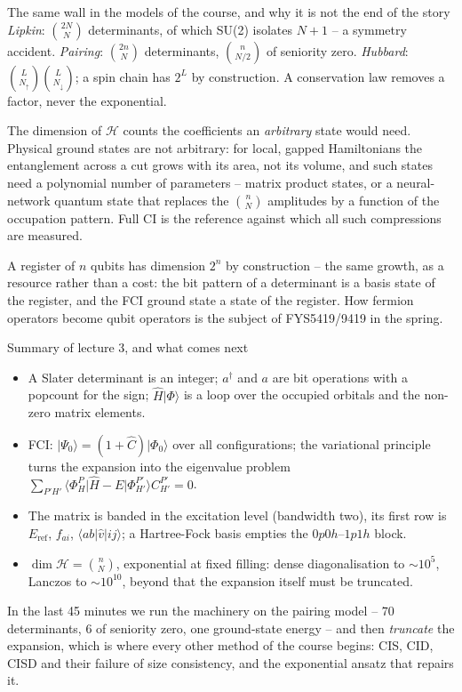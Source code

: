 \documentclass[aspectratio=169,10pt]{beamer}
\newcommand{\mbbox}[1]{%
  \begin{tcolorbox}[colback=paleblue,colframe=uioblue,title={\bfseries Many-body connection}]
  #1
  \end{tcolorbox}}
\newcommand{\qcbox}[1]{%
  \begin{tcolorbox}[colback=paleteal,colframe=teal,title={\bfseries Quantum computing connection}]
  #1
  \end{tcolorbox}}
\newcommand{\ket}[1]{\vert #1\rangle}
\newcommand{\bra}[1]{\langle #1\vert}
\newcommand{\element}[3]{\langle #1\vert #2\vert #3\rangle}
\begin{document}
\begin{frame}{The same wall in the models of the course, and why it is not the end of the story}
  \footnotesize\vspace{-0.5em}
  \emph{Lipkin}: $\binom{2N}{N}$ determinants, of which SU(2) isolates $N+1$ -- a symmetry accident. \emph{Pairing}: $\binom{2n}{N}$ determinants, $\binom{n}{N/2}$ of seniority zero. \emph{Hubbard}: $\binom{L}{N_\uparrow}\binom{L}{N_\downarrow}$; a spin chain has $2^L$ by construction. A conservation law removes a factor, never the exponential.
  \mbbox{\footnotesize The dimension of $\mathcal{H}$ counts the coefficients an \emph{arbitrary} state would need. Physical ground states are not arbitrary: for local, gapped Hamiltonians the entanglement across a cut grows with its area, not its volume, and such states need a polynomial number of parameters -- matrix product states, or a neural-network quantum state that replaces the $\binom{n}{N}$ amplitudes by a function of the occupation pattern. Full CI is the reference against which all such compressions are measured.}
  \qcbox{\footnotesize A register of $n$ qubits has dimension $2^n$ by construction -- the same growth, as a resource rather than a cost: the bit pattern of a determinant is a basis state of the register, and the FCI ground state a state of the register. How fermion operators become qubit operators is the subject of FYS5419/9419 in the spring.}
\end{frame}

\begin{frame}{Summary of lecture 3, and what comes next}
  \begin{itemize}
    \item A Slater determinant is an integer; $a^{\dagger}$ and $a$ are bit operations with a popcount for the sign; $\hat{H}\ket{\Phi}$ is a loop over the occupied orbitals and the non-zero matrix elements.
    \item FCI: $\ket{\Psi_0}=(1+\hat{C})\ket{\Phi_0}$ over all configurations; the variational principle turns the expansion into the eigenvalue problem $\sum_{P'H'}\bra{\Phi_H^P}\hat{H}-E\ket{\Phi_{H'}^{P'}}C_{H'}^{P'}=0$.
    \item The matrix is banded in the excitation level (bandwidth two), its first row is $E_{\mathrm{ref}}$, $f_{ai}$, $\element{ab}{\hat{v}}{ij}$; a Hartree-Fock basis empties the $0p0h$--$1p1h$ block.
    \item $\dim\mathcal{H}=\binom{n}{N}$, exponential at fixed filling: dense diagonalisation to $\sim10^5$, Lanczos to $\sim10^{10}$, beyond that the expansion itself must be truncated.
  \end{itemize}
  \mbbox{In the last 45 minutes we run the machinery on the pairing model -- $70$ determinants, $6$ of seniority zero, one ground-state energy -- and then \emph{truncate} the expansion, which is where every other method of the course begins: CIS, CID, CISD and their failure of size consistency, and the exponential ansatz that repairs it.}
\end{frame}
\end{document}
